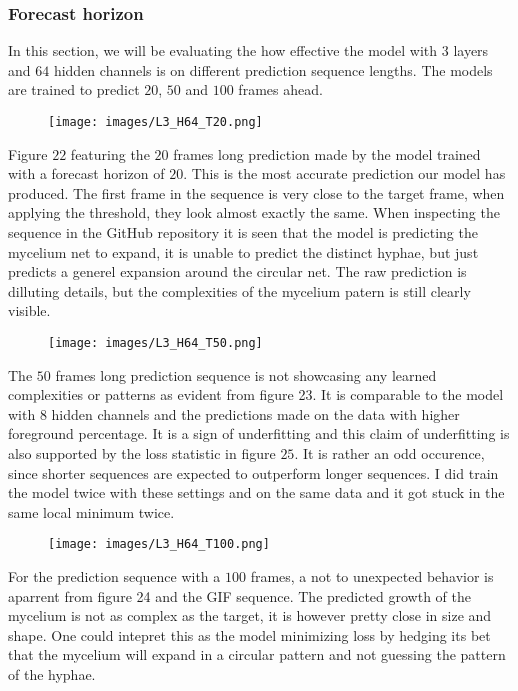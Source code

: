 \documentclass[a4paper,12pt]{article}
\begin{document}
\subsubsection{Forecast horizon}
In this section, we will be evaluating the how effective the model with $3 $ layers and $64$ hidden channels is on different prediction sequence lengths. The models are trained to predict $20$, $50$ and $100$ frames ahead.
\begin{figure}[H]
  \centering
  \texttt{[image: images/L3\_H64\_T20.png]}
  \caption{} %
  \label{fig:n25}
\end{figure}
Figure $22$ featuring the $20$ frames long prediction made by the model trained with a forecast horizon of $20$. This is the most accurate prediction our model has produced. The first frame in the sequence is very close to the target frame, when applying the threshold, they look almost exactly the same.
 When inspecting the sequence in the GitHub repository it is seen that the model is predicting the mycelium net to expand, it is unable to predict the distinct hyphae, but just predicts a generel expansion around the circular net. The raw prediction is dilluting details, but the complexities of the mycelium patern is still clearly visible.
\begin{figure}[H]
  \centering
  \texttt{[image: images/L3\_H64\_T50.png]}
  \caption{} %
  \label{fig:n26}
\end{figure}
The $50$ frames long prediction sequence is not showcasing any learned complexities or patterns as evident from figure 23. It is comparable to the model with $8$ hidden channels and the predictions made on the data with higher foreground percentage. It is a sign of underfitting and this claim of underfitting is also supported by the loss statistic in figure $25$. It is rather an odd occurence, since shorter sequences are expected to outperform longer sequences. I did train the model twice with these settings and on the same data and it got stuck in the same local minimum twice.
\begin{figure}[H]
  \centering
  \texttt{[image: images/L3\_H64\_T100.png]}
  \caption{} %
  \label{fig:n27}
\end{figure}
For the prediction sequence with a $100$ frames, a not to unexpected behavior is aparrent from figure 24 and the GIF sequence. The predicted growth of the mycelium is not as complex as the target, it is however pretty close in size and shape. One could intepret this as the model minimizing loss by hedging its bet that the mycelium will expand in a circular pattern and not guessing the pattern of the hyphae.
\end{document}
